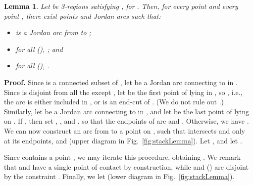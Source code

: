 \documentclass{article}
\newtheorem{lemma}[theorem]{Lemma}
\newcommand{\qedsymbol}{\ding{113}}
\newenvironment{proof}{\par\noindent\textbf{Proof.}}{\mbox{}\hfill\qedsymbol\par\bigskip}
\begin{document}
\begin{lemma}
\label{lma:stackLemma}
Let  be 3-regions satisfying
, for .  Then, for
every point  and every point , there exist points  and Jordan
arcs  such that\textup{:}
\begin{itemize}
\item[\textup{(}i\textup{)}]
 is a Jordan arc from  to
\textup{; }
\item[\textup{(}ii\textup{)}] for all  \textup{(}\textup{)}, \textup{;} and 
\item[\textup{(}iii\textup{)}]
for all  \textup{(}\textup{)}, .
\end{itemize}
\end{lemma}
\begin{proof}
Since  is a
connected subset of , let  be a Jordan arc connecting
 to  in . Since  is disjoint from all the 
except , let  be the first point of  lying in
, so , i.e., the arc  is either included in
, or is an end-cut of . (We do not rule out .) Similarly, let  be a Jordan arc connecting  to
 in , and let  be the last point of 
lying on . If , then set ,
, and .  so that the
endpoints of  are  and .  Otherwise, we have .  We can now construct an arc  from  to a point  on
, such that  intersects
 and  only at its endpoints,
 and  (upper diagram in Fig.~\ref{fig:stackLemma}). Let
, and let .

Since  contains a point , we may
iterate this procedure, obtaining . We remark that  and 
have a single point of contact by construction, while  and
 () are disjoint by the constraint .  Finally, we let  (lower diagram in
Fig.~\ref{fig:stackLemma}).
\end{proof}
\end{document}
